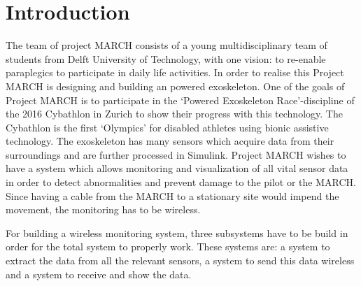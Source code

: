\chapter{Introduction}
The team of project MARCH consists of a young multidisciplinary team of students from Delft University of Technology, with one vision: to re-enable paraplegics to participate in daily life activities. In order to realise this Project MARCH is designing and building an
powered exoskeleton. One of the goals of Project MARCH is to participate in the ‘Powered Exoskeleton Race’-discipline
of the 2016 Cybathlon in Zurich to show their progress with this technology. The Cybathlon is the first ‘Olympics’ for disabled athletes
using bionic assistive technology. 
The exoskeleton has many sensors which acquire data from their surroundings and are further processed in Simulink. Project MARCH wishes to have a system which allows monitoring and visualization of all vital sensor data in order to detect abnormalities and prevent damage to the pilot or the MARCH. Since having a cable from the MARCH to a stationary site would impend the movement, the monitoring has to be wireless. 		

For building a wireless monitoring system, three subsystems have to be build in order for the total system to properly work. These systems are: a system to extract the data from all the relevant sensors, a system to send this data wireless and a system to receive and show the data.

